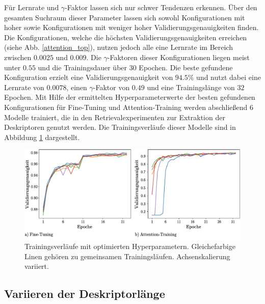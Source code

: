 \clearpage
Für Lernrate und $\gamma$-Faktor lassen sich nur schwer Tendenzen erkennen. Über den gesamten Suchraum dieser Parameter lassen sich sowohl Konfigurationen mit hoher sowie Konfigurationen mit weniger hoher Validierungsgenauigkeiten finden. Die Konfigurationen, welche die höchsten Validierungsgenauigkeiten erreichen (siehe Abb. \ref{attention_top}), nutzen jedoch alle eine Lernrate im Bereich zwischen $0.0025$ und $0.009$. Die $\gamma$-Faktoren dieser Konfigurationen liegen meist unter $0.55$ und die Trainingsdauer über $30$ Epochen.
Die beste gefundene Konfiguration erzielt eine Validierungsgenauigkeit von $94.5\%$ und nutzt dabei eine Lernrate von $0.0078$, einen $\gamma$-Faktor von $0.49$ und eine Trainingslänge von $32$ Epochen. 
Mit Hilfe der ermittelten Hyperparameterwerte der besten gefundenen Konfigurationen für Fine-Tuning und Attention-Training werden abschließend $6$ Modelle trainiert, die in den Retrievalexperimenten zur Extraktion der Deskriptoren genutzt werden. Die Trainingsverläufe dieser Modelle sind in Abbildung \ref{optimized_runs} dargestellt.
\begin{figure}[h]
\includegraphics[scale=0.75]{NNOPT/6_model_verlauf}
\caption{Trainingsverläufe mit optimierten Hyperparametern. Gleichefarbige Linen gehören zu gemeinsamen Trainingsläufen. Achsenskalierung variiert.}
\label{optimized_runs}
\end{figure}

\subsection{Variieren der Deskriptorlänge}\label{pca_experiments}

